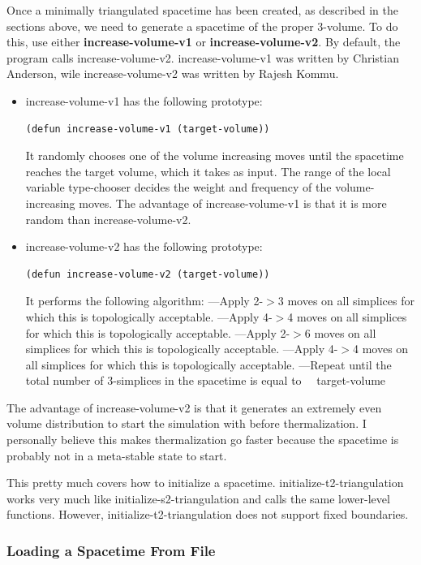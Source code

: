 \documentclass[12pt]{article}
\begin{document}
Once a minimally triangulated spacetime has been created, as described
in the sections above, we need to generate a spacetime of the proper
3-volume. To do this, use either \textbf{increase-volume-v1} or
\textbf{increase-volume-v2}. By default, the program calls
increase-volume-v2. increase-volume-v1 was written by Christian
Anderson, wile increase-volume-v2 was written by Rajesh
Kommu.
\begin{itemize}
\item increase-volume-v1 has the following prototype:
\begin{lstlisting}
(defun increase-volume-v1 (target-volume))
\end{lstlisting}
  It randomly chooses one of the volume increasing moves until the
  spacetime reaches the target volume, which it takes as input. The
  range of the local variable type-chooser decides the weight and
  frequency of the volume-increasing moves. The advantage of
  increase-volume-v1 is that it is more random than
  increase-volume-v2.
\item increase-volume-v2 has the following prototype:
\begin{lstlisting}
(defun increase-volume-v2 (target-volume))
\end{lstlisting}
  It performs the following algorithm:
  \subitem ---Apply 2-$>$3 moves on all simplices for which this is
  topologically acceptable. 
  \subitem ---Apply 4-$>$4 moves on all simplices for which this is 
  topologically acceptable.
  \subitem ---Apply 2-$>$6 moves on all simplices for which this is 
  topologically acceptable.
  \subitem ---Apply 4-$>$4 moves on all simplices for which this is 
  topologically acceptable.
  \subitem ---Repeat until the total number of 3-simplices in the spacetime 
  is equal to \subitem $\quad$target-volume
\end{itemize}
The advantage of increase-volume-v2 is that it generates an extremely
even volume distribution to start the simulation with before
thermalization. I personally believe this makes thermalization go
faster because the spacetime is probably not in a meta-stable state
to start.

This pretty much covers how to initialize a
spacetime. initialize-t2-triangulation works very much like
initialize-s2-triangulation and calls the same lower-level
functions. However, initialize-t2-triangulation does not support fixed
boundaries.

\subsubsection{Loading a Spacetime From File}
\label{sec:load-from-file}
\end{document}
